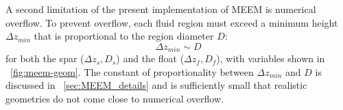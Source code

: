 


A second limitation of the present implementation of MEEM is numerical overflow.
To prevent overflow, each fluid region must exceed a minimum height $ \Delta z_{min}$ that is proportional to the region diameter $D$:
\begin{equation}\label{eq:delta-z-min-intro}
    \Delta z_{min} \sim D
\end{equation}
for both the spar ($\Delta z_s, D_s$) and the float ($\Delta z_f, D_f$), with variables shown in \figurename~\ref{fig:meem-geom}.
The constant of proportionality between $\Delta z_{min}$ and $D$ is discussed in \appendixname~\ref{sec:MEEM_details} and is sufficiently small that realistic geometries do not come close to numerical overflow. 

